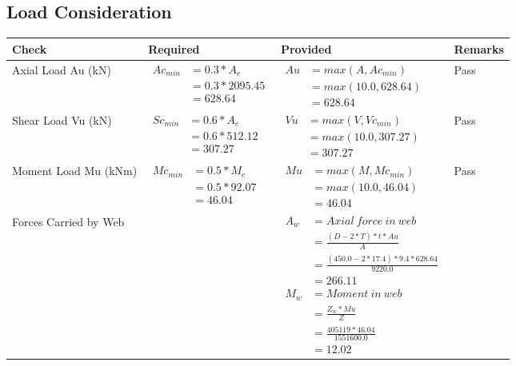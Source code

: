 \documentclass{article}%
\begin{document}
%
\newpage%
\subsection{Load Consideration}%
\label{subsec:LoadConsideration}%
\renewcommand{\arraystretch}{1.2}%
\begin{longtable}{|p{4cm}|p{5cm}|p{5.5cm}|p{1.5cm}|}%
\hline%
\rowcolor{OsdagGreen}%
Check&Required&Provided&Remarks\\%
\hline%
\endhead%
\hline%
Axial Load Au (kN)&$\begin{aligned} Ac_{min} &= 0.3 * A_c\\ &= 0.3 *2095.45\\ &=628.64\end{aligned}$&$\begin{aligned} Au &= max(A,Ac_{min} )\\ &= max( 10.0,628.64)\\ &=628.64\end{aligned}$&Pass\\%
\hline%
Shear Load Vu (kN)&$\begin{aligned} Sc_{min} &= 0.6 * A_c\\ &= 0.6 *512.12\\ &=307.27\end{aligned}$&$\begin{aligned} Vu &= max(V,Vc_{min})\\ &=  max(10.0,307.27)\\ &=307.27\end{aligned}$&Pass\\%
\hline%
Moment Load Mu (kNm)&$\begin{aligned} Mc_{min} &= 0.5 * M_c\\ &= 0.5 *92.07\\ &=46.04\end{aligned}$&$\begin{aligned} Mu &= max(M,Mc_{min} )\\ &= max(10.0,46.04)\\ &=46.04\end{aligned}$&Pass\\%
\hline%
Forces Carried by Web&&$\begin{aligned}A_w &= Axial~ force~ in~ web  \\   &= \frac{(D- 2*T)*t* Au }{A} \\ &= \frac{(450.0- 2*17.4)*9.4*628.64 }{9220.0} \\ &=266.11\\ M_w &= Moment ~in ~web  \\  &= \frac{Z_w * Mu}{Z} \\ &= \frac{405119 * 46.04}{1551600.0} \\ &=12.02\end{aligned}$&\\%

\end{longtable}
\end{document}
